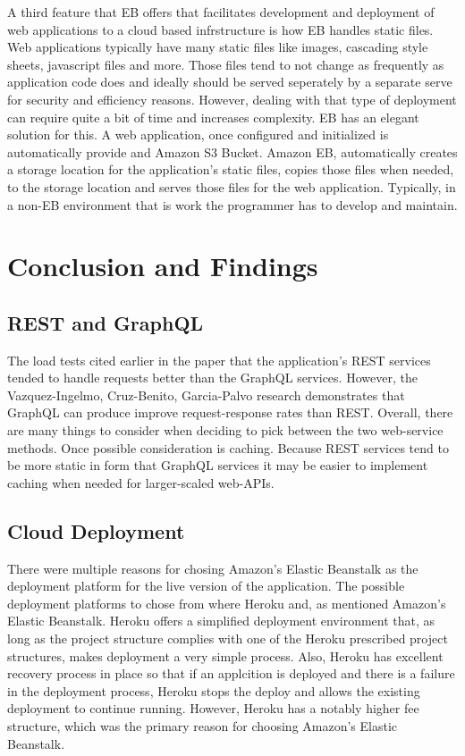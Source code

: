 A third feature that EB offers that facilitates development and deployment of 
web applications to a cloud based infrstructure is how EB handles static 
files.  Web applications typically have many static files like images, 
cascading style sheets, javascript files and more.  Those files tend to not 
change as frequently as application code does and ideally should be served 
seperately by a separate serve for security and efficiency reasons.  However, 
dealing with that type of deployment can require quite a bit of time and 
increases complexity.  EB has an elegant solution for this.  A web 
application, once configured and initialized is automatically provide and 
Amazon S3 Bucket\cite{S3Bucket2018}.  Amazon EB, automatically creates a 
storage location for the application's static files, copies those files when 
needed, to the storage location and serves those files for the web 
application.  Typically, in a non-EB environment that is work the programmer 
has to develop and maintain.

\section{Conclusion and Findings}

\subsection{REST and GraphQL}
The load tests cited earlier in the paper that the application's REST services 
tended to handle requests better than the GraphQL services.  However, the 
Vazquez-Ingelmo, Cruz-Benito, Garcia-Palvo\cite{hid505Vzquez2017} research 
demonstrates that GraphQL can produce improve request-response rates than 
REST.  Overall, there are many things to consider when deciding to pick 
between the two web-service methods.  Once possible consideration is caching.  
Because REST services tend to be more static in form that GraphQL services it 
may be easier to implement caching when needed for larger-scaled web-APIs.

\subsection{Cloud Deployment}
There were multiple reasons for chosing Amazon's Elastic Beanstalk as the 
deployment platform for the live version of the application.  The possible 
deployment platforms to chose from where Heroku\cite{Heroku2018} and, as 
mentioned Amazon's Elastic Beanstalk.  Heroku offers a simplified deployment 
environment that, as long as the project structure complies with one of the 
Heroku prescribed project structures, makes deployment a very simple process.  
Also, Heroku has excellent recovery process in place so that if an applcition 
is deployed and there is a failure in the deployment process, Heroku stops the 
deploy and allows the existing deployment to continue running.  However, 
Heroku has a notably higher fee structure, which was the primary reason for 
choosing Amazon's Elastic Beanstalk.  

